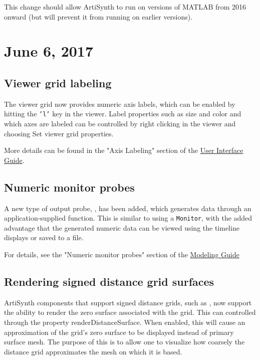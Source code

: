 \documentclass{article}
\begin{document}
\begin{sideblock}
This change should allow ArtiSynth to run on versions of MATLAB from
2016 onward (but will prevent it from running on earlier versions).
\end{sideblock}

\section*{June 6, 2017}

\subsection*{Viewer grid labeling}

The viewer grid now provides numeric axis labels, which can be enabled
by hitting the {\tt 'l'} key in the viewer. Label properties such as
size and color and which axes are labeled can be controlled by right
clicking in the viewer and choosing {\sf Set viewer grid properties}.

More details can be found in the "Axis Labeling" section
of the 
\href{http://www.artisynth.org/doc/html/uiguide/uiguide.html}
{User Interface Guide}.

\subsection*{Numeric monitor probes}

A new type of output probe,
, has been
added, which generates data through an application-supplied function.
This is similar to using a {\tt Monitor}, with the added advantage
that the generated numeric data can be viewed using the timeline
displays or saved to a file.

For details, see the "Numeric monitor probes"
section of the 
\href{http://www.artisynth.org/doc/html/modelguide/modelguide.html}
{Modeling Guide}

\subsection*{Rendering signed distance grid surfaces}

ArtiSynth components that support signed distance grids, such as
, now support the
ability to render the zero surface associated with the grid. This can
controlled through the property {\sf renderDistanceSurface}.  When
enabled, this will cause an approximation of the grid's zero surface
to be displayed instead of primary surface mesh. The purpose of this
is to allow one to visualize how coarsely the distance grid
approximates the mesh on which it is based.
\end{document}
